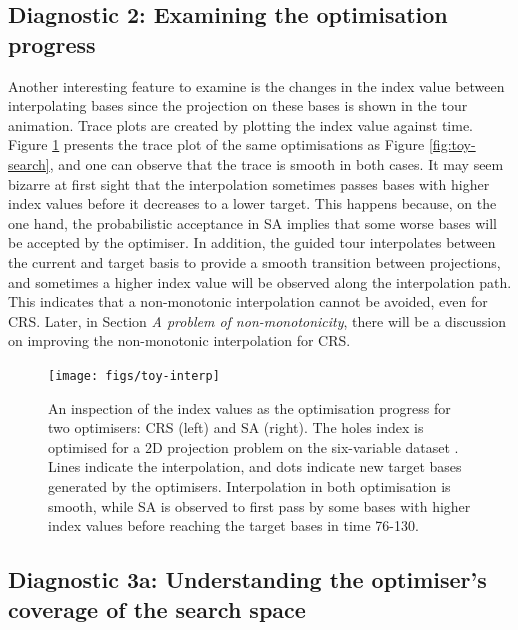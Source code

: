 \hypertarget{toy-interp}{%
\subsection{Diagnostic 2: Examining the optimisation progress}\label{toy-interp}}

Another interesting feature to examine is the changes in the index value between interpolating bases since the projection on these bases is shown in the tour animation. Trace plots are created by plotting the index value against time. Figure \ref{fig:toy-interp} presents the trace plot of the same optimisations as Figure \ref{fig:toy-search}, and one can observe that the trace is smooth in both cases. It may seem bizarre at first sight that the interpolation sometimes passes bases with higher index values before it decreases to a lower target. This happens because, on the one hand, the probabilistic acceptance in SA implies that some worse bases will be accepted by the optimiser. In addition, the guided tour interpolates between the current and target basis to provide a smooth transition between projections, and sometimes a higher index value will be observed along the interpolation path. This indicates that a non-monotonic interpolation cannot be avoided, even for CRS. Later, in Section \emph{A problem of non-monotonicity}, there will be a discussion on improving the non-monotonic interpolation for CRS.

\begin{figure}

{\centering \texttt{[image: figs/toy-interp]} 

}

\caption{An inspection of the index values as the optimisation progress for two optimisers: CRS (left) and SA (right). The holes index is optimised for a 2D projection problem on the six-variable dataset . Lines indicate the interpolation, and dots indicate new target bases generated by the optimisers. Interpolation in both optimisation is smooth, while SA is observed to first pass by some bases with higher index values before reaching the target bases in time 76-130.}\label{fig:toy-interp}
\end{figure}

\hypertarget{toy-pca}{%
\subsection{Diagnostic 3a: Understanding the optimiser's coverage of the search space}\label{toy-pca}}

